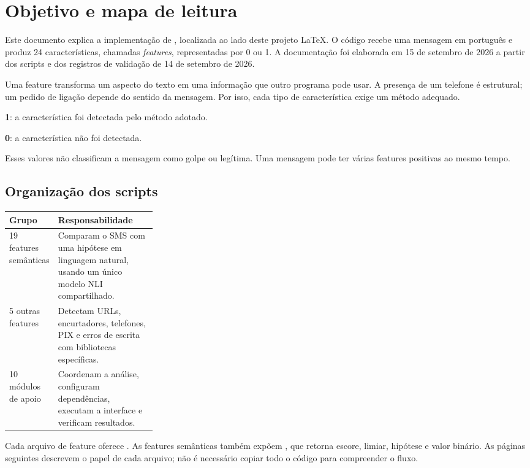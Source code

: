 \section{Objetivo e mapa de leitura}
Este documento explica a implementação de , localizada ao lado deste projeto LaTeX. O código recebe uma mensagem em português e produz 24 características, chamadas \textit{features}, representadas por 0 ou 1. A documentação foi elaborada em 15 de setembro de 2026 a partir dos scripts e dos registros de validação de 14 de setembro de 2026.

Uma feature transforma um aspecto do texto em uma informação que outro programa pode usar. A presença de um telefone é estrutural; um pedido de ligação depende do sentido da mensagem. Por isso, cada tipo de característica exige um método adequado.

\begin{caixainfo}
\textbf{1}: a característica foi detectada pelo método adotado.\par
\textbf{0}: a característica não foi detectada.\par
Esses valores não classificam a mensagem como golpe ou legítima. Uma mensagem pode ter várias features positivas ao mesmo tempo.
\end{caixainfo}

\subsection{Organização dos scripts}
\begin{tabularx}{\linewidth}{@{}p{0.28\linewidth}X@{}}
\toprule
\textbf{Grupo} & \textbf{Responsabilidade} \\
\midrule
19 features semânticas & Comparam o SMS com uma hipótese em linguagem natural, usando um único modelo NLI compartilhado. \\
5 outras features & Detectam URLs, encurtadores, telefones, PIX e erros de escrita com bibliotecas específicas. \\
10 módulos de apoio & Coordenam a análise, configuram dependências, executam a interface e verificam resultados. \\
\bottomrule
\end{tabularx}

Cada arquivo de feature oferece . As features semânticas também expõem , que retorna escore, limiar, hipótese e valor binário. As páginas seguintes descrevem o papel de cada arquivo; não é necessário copiar todo o código para compreender o fluxo.

